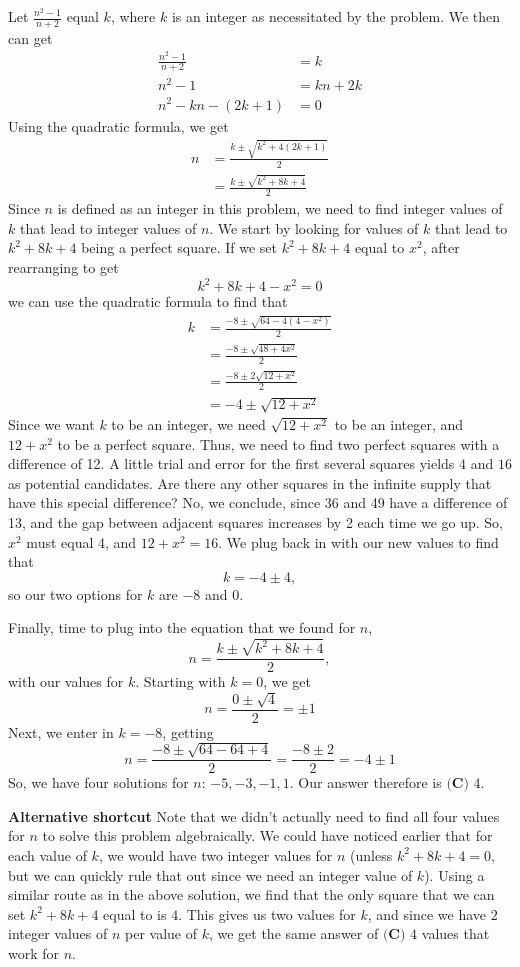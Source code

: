 \begin{enumerate}
Let $\frac{n^{2}-1}{n+2}$ equal $k$, where $k$ is an integer as necessitated by the problem.  We then can get \begin{align*}\frac{n^{2}-1}{n+2}&=k \\ n^{2}-1&=kn+2k \\ n^{2}-kn-(2k+1)&=0 \end{align*}
 Using the quadratic formula, we get \begin{align*}n&=\frac{k\pm \sqrt{k^{2}+4(2k+1)}}{2}\\&=\frac{k\pm \sqrt{k^{2}+8k+4}}{2}\end{align*}
  Since $n$ is defined as an integer in this problem, we need to find integer values of $k$ that lead to integer values of $n$.  We start by looking for values of $k$ that lead to $k^{2}+8k+4$ being a perfect square.  If we set $k^{2}+8k+4$ equal to $x^{2}$, after rearranging to get 
 \[k^{2}+8k+4-x^{2}=0\] we can use the quadratic formula to find that \begin{align*}k&=\frac{-8\pm \sqrt{64-4(4-x^{2})}}{2}\\ &=\frac{-8\pm \sqrt{48+4x^{2}}}{2}\\ &=\frac{-8\pm 2\sqrt{12+x^{2}}}{2}\\ &=-4 \pm \sqrt{12+x^{2}} \end{align*}
Since we want $k$ to be an integer, we need $\sqrt{12+x^{2}}$ to be an integer, and $12+x^{2}$ to be a perfect square.  Thus, we need to find two perfect squares with a difference of 12.  A little trial and error for the first several squares yields $4$ and $16$ as potential candidates.  Are there any other squares in the infinite supply that have this special difference?  No, we conclude, since 36 and 49 have a difference of 13, and the gap between adjacent squares increases by 2 each time we go up.  So, $x^{2}$ must equal 4, and $12+x^{2}=16$.  We plug back in with our new values to find that 
 \[k=-4\pm 4,\] so our two options for $k$ are $-8$ and $0$.  

 Finally, time to plug into the equation that we found for $n$, 
 \[n=\frac{k\pm \sqrt{k^{2}+8k+4}}{2},\] with our values for $k$.  Starting with $k=0$, we get 
 \[n=\frac{0\pm \sqrt{4}}{2}=\pm 1\] Next, we enter in $k=-8$, getting 
 \[n=\frac{-8\pm \sqrt{64-64+4}}{2}=\frac{-8\pm 2}{2}=-4\pm 1\] So, we have four solutions for $n$: $-5, -3, -1, 1$.  Our answer therefore is $\boxed{\textbf{(C) }4}$.

 


 \textbf{Alternative shortcut} Note that we didn't actually need to find all four values for $n$ to solve this problem algebraically.  We could have noticed earlier that for each value of $k$, we would have two integer values for $n$ (unless $k^{2}+8k+4=0$, but we can quickly rule that out since we need an integer value of $k$).  Using a similar route as in the above solution, we find that the only square that we can set $k^{2}+8k+4$ equal to is $4$.  This gives us two values for $k$, and since we have $2$ integer values of $n$ per value of $k$, we get the same answer of $\boxed{\textbf{(C) }4}$ values that work for $n$.


\end{enumerate}
